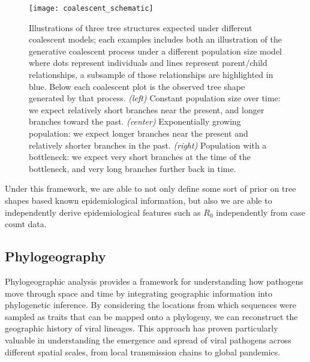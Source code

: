 \begin{figure}[ht]
  \centering
  \texttt{[image: coalescent\_schematic]}
  \caption[Demography effects tree shape]{Illustrations of three tree structures expected under different coalescent models; each examples includes both an illustration of the generative coalescent process under a different population size model where dots represent individuals and lines represent parent/child relationships, a subsample of those relationships are highlighted in blue. Below each coalescent plot is the observed tree shape generated by that process. \textit{(left)} Constant population size over time: we expect relatively short branches near the present, and longer branches toward the past. \textit{(center)} Exponentially growing population: we expect longer branches near the present and relatively shorter branches in the past. \textit{(right)} Population with a bottleneck: we expect very short branches at the time of the bottleneck, and very long branches further back in time.
  }
  \label{fig:coalescentOverview}
\end{figure}

Under this framework, we are able to not only define some sort of prior on tree shapes based known epidemiological information, but also we are able to independently derive epidemiological features such as $R_0$ independently from case count data.

\subsection{Phylogeography}\label{ssec:phylogeography}
Phylogeographic analysis provides a framework for understanding how pathogens move through space and time by integrating geographic information into phylogenetic inference.
By considering the locations from which sequences were sampled as traits that can be mapped onto a phylogeny, we can reconstruct the geographic history of viral lineages.
This approach has proven particularly valuable in understanding the emergence and spread of viral pathogens across different spatial scales, from local transmission chains to global pandemics.


